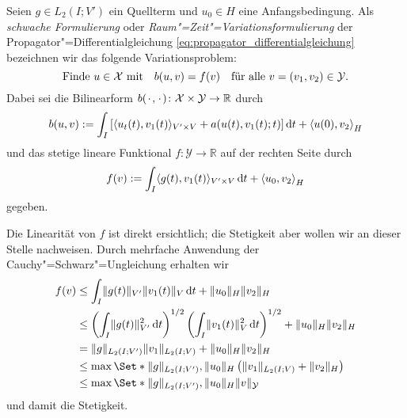 \documentclass[../main.tex]{subfiles}
\begin{document}
\begin{Definition}
\label{definition:raum_zeit_variationsformulierung}
    Seien $g \in L_{2}(I; V')$ ein Quellterm und $u_{0} \in H$ eine Anfangsbedingung.
    Als \emph{schwache Formulierung} oder \emph{Raum"=Zeit"=Variationsformulierung} der Propagator"=Differentialgleichung \cref{eq:propagator_differentialgleichung} bezeichnen wir das folgende Variationsproblem:
    \begin{equation}
    \label{eq:raum_zeit_variationsformulierung}
        \text{Finde}~u \in \mathcal X \text{ mit} \quad  b(u, v) = f(v) \quad \fa v = (v_{1}, v_{2}) \in \mathcal Y.
    \end{equation}
    Dabei sei die Bilinearform $b({\mkern2mu\cdot\mkern2mu}, {\mkern2mu\cdot\mkern2mu}) \colon \mathcal X \times \mathcal Y \to \mathbb{R}$ durch
    \begin{equation}
        \label{eq:raum_zeit_variationsformulierung:lhs}
        b(u, v)
            := \int_{I} \left[ \skp{u_{t}(t)}{v_{1}(t)}{V' \times V} + a(u(t), v_{1}(t); t) \right]  \diff t + \skprod{u(0)}{v_{2}}_{H}
    \end{equation}
    und das stetige lineare Funktional $f \colon \mathcal Y \to \mathbb{R}$ auf der rechten Seite durch
    \begin{equation}
        \label{eq:raum_zeit_variationsformulierung:rhs}
        f(v) := \int_{I} \skp{g(t)}{v_{1}(t)}{V' \times V} \diff t + \skprod{u_{0}}{v_{2}}_{H}
    \end{equation}
    gegeben.
\end{Definition}

\begin{Bemerkung}
\label{bemerkung:raum_zeit_variationsformulierung_rhs_stetig}
    Die Linearität von $f$ ist direkt ersichtlich; die Stetigkeit aber wollen wir an dieser Stelle nachweisen.
    Durch mehrfache Anwendung der Cauchy"=Schwarz"=Ungleichung erhalten wir
    \begin{equation}
        \begin{aligned}
            f(v)
            &\leq \int_{I} \norm{g(t)}_{V'} \norm{v_{1}(t)}_{V} \diff t + \norm{u_{0}}_{H} \norm{v_{2}}_{H}
            \\&\leq \left( \int_{I} \norm{g(t)}^{2}_{V'} \diff t \right)^{1/2} \left( \int_{I} \norm{v_{1}(t)}^{2}_{V} \diff t \right)^{1/2} + \norm{u_{0}}_{H} \norm{v_{2}}_{H}
            \\&= \norm{g}_{L_{2}(I; V')} \norm{v_{1}}_{L_{2}(I; V)} + \norm{u_{0}}_{H} \norm{v_{2}}_{H}
            \\&\leq \max\Set*{\norm{g}_{L_{2}(I; V')}, \norm{u_{0}}_{H}} \left( \norm{v_{1}}_{L_{2}(I; V)} + \norm{v_{2}}_{H} \right)
            \\&\leq \max\Set*{\norm{g}_{L_{2}(I; V')}, \norm{u_{0}}_{H}} \norm{v}_{\mathcal Y}
        \end{aligned}
    \end{equation}
    und damit die Stetigkeit.
\end{Bemerkung}
\end{document}
